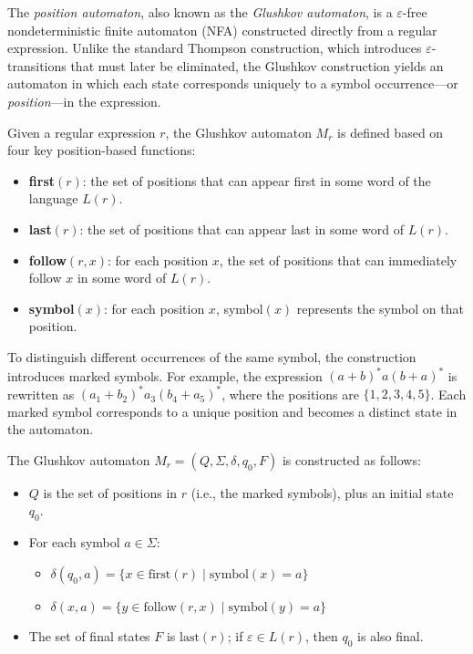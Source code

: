 The \emph{position automaton}, also known as the \emph{Glushkov automaton}, is a $\varepsilon$-free nondeterministic finite automaton (NFA) constructed directly from a regular expression. Unlike the standard Thompson construction, which introduces $\varepsilon$-transitions that must later be eliminated, the Glushkov construction yields an automaton in which each state corresponds uniquely to a symbol occurrence---or \emph{position}---in the expression. \cite{mesh-of-automata}

Given a regular expression $r$, the Glushkov automaton $M_r$ is defined based on four key position-based functions:

\begin{itemize}
    \item \textbf{first$(r)$}: the set of positions that can appear first in some word of the language $L(r)$.
    \item \textbf{last$(r)$}: the set of positions that can appear last in some word of $L(r)$.
    \item \textbf{follow$(r, x)$}: for each position $x$, the set of positions that can immediately follow $x$ in some word of $L(r)$.
    \item \textbf{symbol$(x)$}: for each position $x$, symbol$(x)$ represents the symbol on that position.
\end{itemize}

To distinguish different occurrences of the same symbol, the construction introduces marked symbols. For example, the expression $(a + b)^*a(b + a)^*$ is rewritten as $(a_1 + b_2)^*a_3(b_4 + a_5)^*$, where the positions are $\{1,2,3,4,5\}$. Each marked symbol corresponds to a unique position and becomes a distinct state in the automaton.

The Glushkov automaton $M_r = (Q, \Sigma, \delta, q_0, F)$ is constructed as follows:
\begin{itemize}
    \item $Q$ is the set of positions in $r$ (i.e., the marked symbols), plus an initial state $q_0$.
    \item For each symbol $a \in \Sigma$:
    \begin{itemize}
        \item $\delta(q_0, a) = \{ x \in \text{first}(r) \mid \text{symbol}(x) = a \}$
        \item $\delta(x, a) = \{ y \in \text{follow}(r, x) \mid \text{symbol}(y) = a \}$
    \end{itemize}
    \item The set of final states $F$ is $\text{last}(r)$; if $\varepsilon \in L(r)$, then $q_0$ is also final.
\end{itemize}

